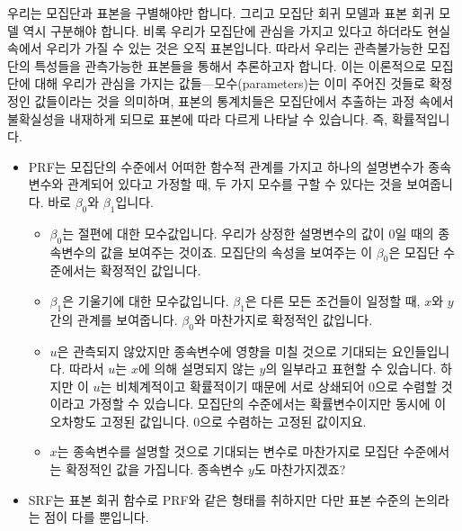 \documentclass[
]{book}
\begin{document}
우리는 모집단과 표본을 구별해야만 합니다. 그리고 모집단 회귀 모델과 표본 회귀 모델 역시 구분해야 합니다. 비록 우리가 모집단에 관심을 가지고 있다고 하더라도 현실 속에서 우리가 가질 수 있는 것은 오직 표본입니다. 따라서 우리는 관측불가능한 모집단의 특성들을 관측가능한 표본들을 통해서 추론하고자 합니다. 이는 이론적으로 모집단에 대해 우리가 관심을 가지는 값들---모수(parameters)는 이미 주어진 것들로 확정정인 값들이라는 것을 의미하며, 표본의 통계치들은 모집단에서 추출하는 과정 속에서 불확실성을 내재하게 되므로 표본에 따라 다르게 나타날 수 있습니다. 즉, 확률적입니다.

\begin{itemize}
\item
  PRF는 모집단의 수준에서 어떠한 함수적 관계를 가지고 하나의 설명변수가 종속변수와 관계되어 있다고 가정할 때, 두 가지 모수를 구할 수 있다는 것을 보여줍니다. 바로 \(\beta_0\)와 \(\beta_1\)입니다.

  \begin{itemize}
  \item
    \(\beta_0\)는 절편에 대한 모수값입니다. 우리가 상정한 설명변수의 값이 0일 때의 종속변수의 값을 보여주는 것이죠. 모집단의 속성을 보여주는 이 \(\beta_0\)은 모집단 수준에서는 확정적인 값입니다.
  \item
    \(\beta_1\)은 기울기에 대한 모수값입니다. \(\beta_1\)은 다른 모든 조건들이 일정할 때, \(x\)와 \(y\) 간의 관계를 보여줍니다. \(\beta_0\)와 마찬가지로 확정적인 값입니다.
  \item
    \(u\)은 관측되지 않았지만 종속변수에 영향을 미칠 것으로 기대되는 요인들입니다. 따라서 \(u\)는 \(x\)에 의해 설명되지 않는 \(y\)의 일부라고 표현할 수 있습니다. 하지만 이 \(u\)는 비체계적이고 확률적이기 때문에 서로 상쇄되어 0으로 수렴할 것이라고 가정할 수 있습니다. 모집단의 수준에서는 확률변수이지만 동시에 이 오차항도 고정된 값입니다. 0으로 수렴하는 고정된 값이지요.
  \item
    \(x\)는 종속변수를 설명할 것으로 기대되는 변수로 마찬가지로 모집단 수준에서는 확정적인 값을 가집니다. 종속변수 \(y\)도 마찬가지겠죠?
  \end{itemize}
\item
  SRF는 표본 회귀 함수로 PRF와 같은 형태를 취하지만 다만 표본 수준의 논의라는 점이 다를 뿐입니다.


\end{itemize}
\end{document}
